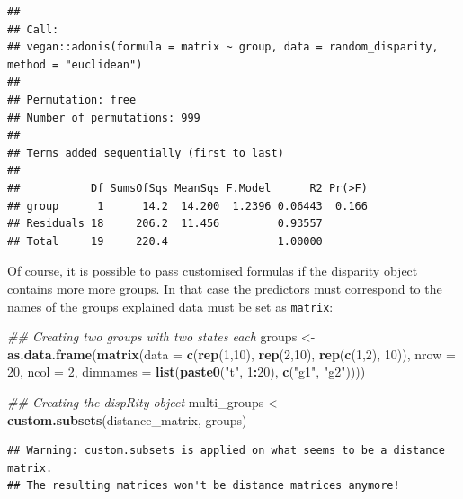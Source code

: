 \documentclass[]{book}
\newenvironment{Shaded}{\begin{snugshade}}{\end{snugshade}}
\newcommand{\CommentTok}[1]{\textcolor[rgb]{0.56,0.35,0.01}{\textit{#1}}}
\newcommand{\DataTypeTok}[1]{\textcolor[rgb]{0.13,0.29,0.53}{#1}}
\newcommand{\DecValTok}[1]{\textcolor[rgb]{0.00,0.00,0.81}{#1}}
\newcommand{\KeywordTok}[1]{\textcolor[rgb]{0.13,0.29,0.53}{\textbf{#1}}}
\newcommand{\NormalTok}[1]{#1}
\newcommand{\OperatorTok}[1]{\textcolor[rgb]{0.81,0.36,0.00}{\textbf{#1}}}
\newcommand{\StringTok}[1]{\textcolor[rgb]{0.31,0.60,0.02}{#1}}
\begin{document}
\begin{verbatim}
## 
## Call:
## vegan::adonis(formula = matrix ~ group, data = random_disparity,      method = "euclidean") 
## 
## Permutation: free
## Number of permutations: 999
## 
## Terms added sequentially (first to last)
## 
##           Df SumsOfSqs MeanSqs F.Model      R2 Pr(>F)
## group      1      14.2  14.200  1.2396 0.06443  0.166
## Residuals 18     206.2  11.456         0.93557       
## Total     19     220.4                 1.00000
\end{verbatim}

Of course, it is possible to pass customised formulas if the disparity object contains more more groups.
In that case the predictors must correspond to the names of the groups explained data must be set as \texttt{matrix}:

\begin{Shaded}
\begin{Highlighting}[]
\CommentTok{## Creating two groups with two states each}
\NormalTok{groups <-}\StringTok{ }\KeywordTok{as.data.frame}\NormalTok{(}\KeywordTok{matrix}\NormalTok{(}\DataTypeTok{data =} \KeywordTok{c}\NormalTok{(}\KeywordTok{rep}\NormalTok{(}\DecValTok{1}\NormalTok{,}\DecValTok{10}\NormalTok{),}
                                        \KeywordTok{rep}\NormalTok{(}\DecValTok{2}\NormalTok{,}\DecValTok{10}\NormalTok{),}
                                        \KeywordTok{rep}\NormalTok{(}\KeywordTok{c}\NormalTok{(}\DecValTok{1}\NormalTok{,}\DecValTok{2}\NormalTok{), }\DecValTok{10}\NormalTok{)),}
                        \DataTypeTok{nrow =} \DecValTok{20}\NormalTok{, }\DataTypeTok{ncol =} \DecValTok{2}\NormalTok{,}
                        \DataTypeTok{dimnames =} \KeywordTok{list}\NormalTok{(}\KeywordTok{paste0}\NormalTok{(}\StringTok{"t"}\NormalTok{, }\DecValTok{1}\OperatorTok{:}\DecValTok{20}\NormalTok{),}
                                        \KeywordTok{c}\NormalTok{(}\StringTok{"g1"}\NormalTok{, }\StringTok{"g2"}\NormalTok{))))}

\CommentTok{## Creating the dispRity object}
\NormalTok{multi_groups <-}\StringTok{ }\KeywordTok{custom.subsets}\NormalTok{(distance_matrix, groups)}
\end{Highlighting}
\end{Shaded}

\begin{verbatim}
## Warning: custom.subsets is applied on what seems to be a distance matrix.
## The resulting matrices won't be distance matrices anymore!
\end{verbatim}
\end{document}

